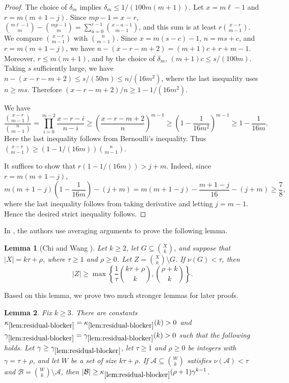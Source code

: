 \documentclass[10pt,a4paper]{article}
\numberwithin{equation}{section}
\newtheorem{lemma}[lemma]{Lemma}
\theoremstyle{definition}
\newcommand{\A}{\mathcal A}
\newcommand{\B}{\mathcal B}
\begin{document}
\begin{proof}
        The choice of $\delta_m$ implies $\delta_m\le 1/(100m(m+1))$.
        Let $x=m\ell-1$ and $r=m(m+1-j)$.
        Since $mp-1=x-r$, $\binom{m\ell-1}{m}-\binom{mp-1}{m}=\sum_{a=0}^{r-1}\binom{x-a-1}{m-1}$, and this sum is at least $r\binom{x-r}{m-1}$.
        We compare $\binom{x-r}{m-1}$ with $\binom n{m-1}$.
        Since $x=m(s-c)-1$, $n=ms+c$, and $r=m(m+1-j)$, we have $n-(x-r-m+2)=(m+1)c+r+m-1$.
        Moreover, $r\le m(m+1)$, and by the choice of $\delta_m$, $(m+1)c\le s/(100m)$.
        Taking $s$ sufficiently large, we have $n-(x-r-m+2)\le s/(50m)\le n/(16m^2)$, where the last inequality uses $n\ge ms$.
        Therefore $(x-r-m+2)/n\ge 1-1/(16m^2)$.

        We have
        \[
                \frac{\binom{x-r}{m-1}}{\binom n{m-1}}
                =\prod_{i=0}^{m-2}\frac{x-r-i}{n-i}
                \ge
                \left(\frac{x-r-m+2}{n}\right)^{m-1}
                \ge
                \left(1-\frac1{16m^2}\right)^{m-1}
                \ge
                1-\frac1{16m}.
        \]
        Here the last inequality follows from Bernoulli's inequality.
        Thus $\binom{x-r}{m-1}\ge (1-1/(16m))\binom n{m-1}$.

        It suffices to show that $r(1-1/(16m))>j+m$.
        Indeed, since $r=m(m+1-j)$,
        \[
                m(m+1-j)\left(1-\frac1{16m}\right)-(j+m)
                =
                m(m+1-j)-\frac{m+1-j}{16}-(j+m)\ge \frac{7}{8},
        \]
        where the last inequality follows from taking derivative and letting $j=m-1$.
        Hence the desired strict inequality follows.
\end{proof}



In \cite{ChiWangK1}, the authors use averaging arguments to prove the following lemma.
\begin{lemma}[Chi and Wang \cite{ChiWangK1}]\label{lem:blocker}
        Let $k\ge2$, let $G\subseteq\binom Xk$, and suppose that $|X|=k\tau+\rho$, where $\tau\ge1$ and $\rho\ge0$.
        Let $Z=\binom Xk\setminus G$.
        If $\nu(G)<\tau$, then
        \[
                |Z|\ge
                \max\left\{
                \frac1{\tau}\binom{k\tau+\rho}{k},
                \binom{\rho+k}{k}
                \right\}.
        \]
\end{lemma}

Based on this lemma, we prove two much stronger lemmas for later proofs.

\begin{lemma}\label{lem:residual-blocker}
        Fix $k\ge3$.
        There are constants $\kappa_{\ref{lem:residual-blocker}}=\kappa_{\ref{lem:residual-blocker}}(k)>0$ and $\gamma_{\ref{lem:residual-blocker}}=\gamma_{\ref{lem:residual-blocker}}(k)>0$ such that the following holds.
        Let $\gamma\ge\gamma_{\ref{lem:residual-blocker}}$, let $\tau\ge1$ and $\rho\ge0$ be integers with $\gamma=\tau+\rho$, and let $W$ be a set of size $k\tau+\rho$.
        If $\A\subseteq\binom Wk$ satisfies $\nu(\A)<\tau$ and $\B=\binom Wk\setminus\A$, then $|\B|\ge \kappa_{\ref{lem:residual-blocker}}(\rho+1)\gamma^{k-1}$.
\end{lemma}
\end{document}
